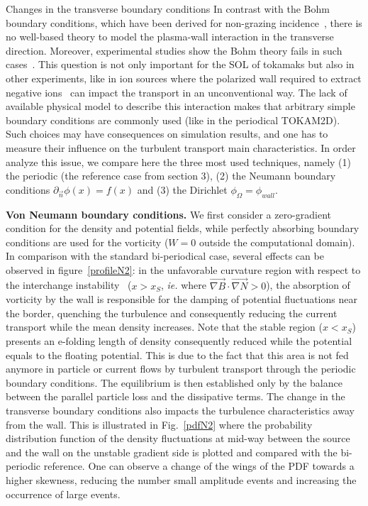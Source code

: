 \documentclass[a4paper,12pt]{article} %
\begin{document}
\begin{section}{Changes in the transverse boundary conditions}
In contrast with the Bohm boundary conditions, which have been derived for 
non-grazing incidence~\cite{Stangeby}, there is no well-based theory to model the plasma-wall interaction 
in the transverse direction. 
Moreover, experimental studies show the Bohm theory fails in such cases~\cite{Krasheninnikova}. 
This question is not only important for the SOL of tokamaks but also in other experiments, like in ion sources 
where the polarized wall required to extract negative ions~\cite{Hagelaar} can impact 
the transport in an unconventional way. 
The lack of available physical model to describe this interaction makes that arbitrary simple boundary conditions 
are commonly used (like in the periodical TOKAM2D). Such choices may have consequences on simulation results, 
and one has to measure their influence on the turbulent transport main characteristics.
In order analyze this issue, we compare here the three most used techniques, namely (1) the periodic (the reference 
case from section 3), (2) the Neumann boundary conditions $\partial_{\vec{n}}\phi(x)= f(x)$ and (3) the 
Dirichlet $\phi_\Omega = \phi_{wall}$. 

\textbf{Von Neumann boundary conditions.} We first consider a zero-gradient condition for the
density and potential fields, while perfectly absorbing boundary conditions are used for the vorticity 
($W=0$ outside the computational domain). 
In comparison with the standard bi-periodical case, several effects can be observed in figure~\ref{profileN2}: 
in the unfavorable curvature region with respect to the interchange instability~\cite{Sarazin} ($x>x_{S}$, \emph{ie.} 
where $\vec{\nabla B}\cdot\vec{\nabla N}>0$), the absorption of vorticity
by the wall is responsible for the damping of potential fluctuations near the border, quenching the turbulence 
and consequently reducing the current transport while the mean density increases.
Note that the stable region ($x<x_S$) presents an e-folding length of density consequently 
reduced while the potential equals to 
the floating potential. This is due to the fact that this area is not fed anymore in particle or current flows 
by turbulent transport through the periodic boundary conditions. The equilibrium is then 
established only by the balance between the parallel particle loss and the dissipative terms. The change in the 
transverse boundary conditions also impacts the turbulence characteristics away from the wall. 
This is illustrated in Fig.~\ref{pdfN2} where the probability distribution function of the density fluctuations 
at mid-way between the source and the wall on the unstable gradient side is plotted and compared with 
the bi-periodic reference. 
One can observe a change of the wings of the PDF towards a higher skewness, reducing the number small amplitude events 
and increasing the occurrence of large events.


\end{section}
\end{document}
